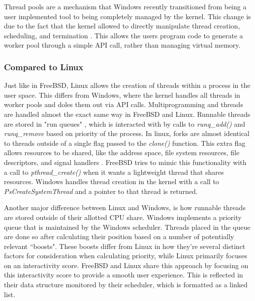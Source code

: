 \par Thread pools are a mechanism that Windows recently transitioned from being a user implemented tool to being completely managed by the kernel.
This change is due to the fact that the kernel allowed to directly manipulate thread creation, scheduling, and termination \cite{win:1}.
This allows the users program code to generate a worker pool through a simple API call, rather than managing virtual memory.

\subsubsection{Compared to Linux}
\label{sub:Process Linux}

\par Just like in FreeBSD, Linux allows the creation of threads within a process in the user space.
This differs from Windows, where the kernel handles all threads in worker pools and doles them out via API calls.
Multiprogramming and threads are handled almost the exact same way in FreeBSD and Linux.
Runnable threads are stored in "run queues" \cite{bsd:1} \cite{linux:1}, which is interacted with by calls to \textit{runq\_add()} and \textit{runq\_remove} based on priority of the process.
In linux, forks are almost identical to threads outside of a single flag passed to the \textit{clone()} function.
This extra flag allows resources to be shared, like the address space, file system resources, file descriptors, and signal handlers \cite{linux:1}.
FreeBSD tries to mimic this functionality with a call to \textit{pthread\_create()} when it wants a lightweight thread that shares resources.
Windows handles thread creation in the kernel with a call to \textit{PsCreateSystemThread} and a pointer to that thread is returned.

\par Another major difference between Linux and Windows, is how runnable threads are stored outside of their allotted CPU share.
Windows implements a priority queue that is maintained by the Windows scheduler.
Threads placed in the queue are done so after calculating their position based on a number of potentially relevant ``boosts".
These boosts differ from Linux in how they're several distinct factors for consideration when calculating priority, while Linux primarily focuses on an interactivity score.
FreeBSD and Linux share this approach by focusing on this interactivity score to provide a smooth user experience.
This is reflected in their data structure monitored by their scheduler, which is formatted as a linked list.


